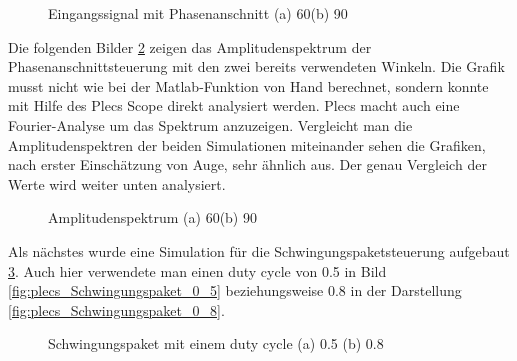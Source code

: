 \begin{figure}[ht!]
	\centering
	\qquad
	\caption{Eingangssignal mit Phasenanschnitt (a) 60\textdegree (b) 90\textdegree}
	\label{fig:Eingangssignal simuliert mit Plecs}
\end{figure}

\newpage

Die folgenden Bilder \ref{fig:plecs_Amplitudenspektrum} zeigen das Amplitudenspektrum der Phasenanschnittsteuerung mit den zwei bereits verwendeten Winkeln. Die Grafik musst nicht wie bei der Matlab-Funktion von Hand berechnet, sondern konnte mit Hilfe des Plecs Scope direkt analysiert werden. Plecs macht auch eine Fourier-Analyse um das Spektrum anzuzeigen. Vergleicht man die Amplitudenspektren der beiden Simulationen miteinander sehen die Grafiken, nach erster Einschätzung von Auge, sehr ähnlich aus. Der genau Vergleich der Werte wird weiter unten analysiert.   
     
\begin{figure}[ht!]
	\centering
	\qquad
	\caption{Amplitudenspektrum (a) 60\textdegree (b) 90\textdegree}
	\label{fig:plecs_Amplitudenspektrum}
\end{figure}

Als nächstes wurde eine Simulation für die Schwingungspaketsteuerung aufgebaut \ref{fig:plecs_Schwingungspakete}. Auch hier verwendete man einen duty cycle von 0.5 in Bild  \ref{fig:plecs_Schwingungspaket_0_5} beziehungsweise 0.8 in der Darstellung \ref{fig:plecs_Schwingungspaket_0_8}.  
\begin{figure}[ht!]
	\centering
	\qquad
	\caption{Schwingungspaket mit einem duty cycle (a) 0.5 (b) 0.8}
	\label{fig:plecs_Schwingungspakete}
\end{figure}

